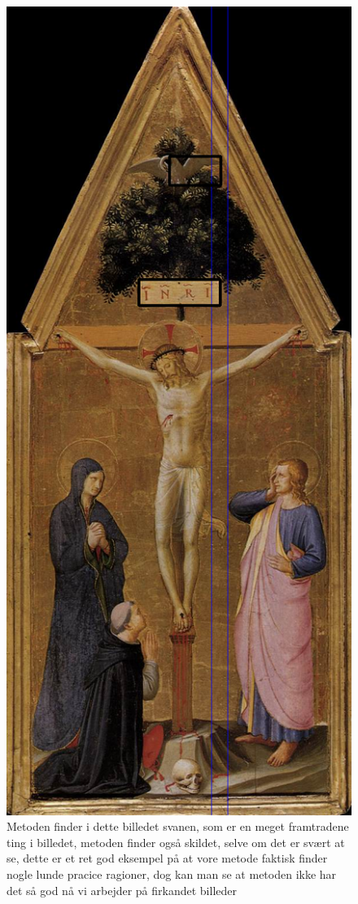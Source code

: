 \begin{figure}[h!!]
	\begin{center}
		\includegraphics[scale=0.30,angle=0]{afsnit/afprovning/billeder/BB09crucif.png}
	\end{center}
	\caption[]{Metoden finder i dette billedet svanen, som er en meget
	           framtradene ting i billedet, metoden finder også skildet,
	           selve om det er svært at se, dette er et ret god eksempel
	           på at vore metode faktisk finder nogle lunde pracice
	           ragioner, dog kan man se at metoden ikke har det så god
	           nå vi arbejder på firkandet billeder}
	\label{BB09crucif}
\end{figure}

